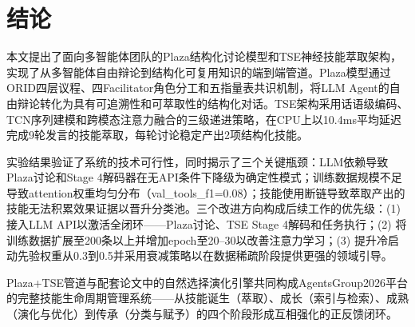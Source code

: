\documentclass[conference]{IEEEtran}
\begin{document}
\section{结论}

本文提出了面向多智能体团队的Plaza结构化讨论模型和TSE神经技能萃取架构，实现了从多智能体自由辩论到结构化可复用知识的端到端管道。Plaza模型通过ORID四层议程、四Facilitator角色分工和五指量表共识机制，将LLM Agent的自由辩论转化为具有可追溯性和可萃取性的结构化对话。TSE架构采用话语级编码、TCN序列建模和跨模态注意力融合的三级递进策略，在CPU上以10.4ms平均延迟完成9轮发言的技能萃取，每轮讨论稳定产出2项结构化技能。

实验结果验证了系统的技术可行性，同时揭示了三个关键瓶颈：LLM依赖导致Plaza讨论和Stage 4解码器在无API条件下降级为确定性模式；训练数据规模不足导致attention权重均匀分布（val\_tools\_f1=0.08）；技能使用断链导致萃取产出的技能无法积累效果证据以晋升分类池。三个改进方向构成后续工作的优先级：(1) 接入LLM API以激活全闭环——Plaza讨论、TSE Stage 4解码和任务执行；(2) 将训练数据扩展至200条以上并增加epoch至20--30以改善注意力学习；(3) 提升冷启动先验权重从0.3到0.5并采用衰减策略以在数据稀疏阶段提供更强的领域引导。

Plaza+TSE管道与配套论文中的自然选择演化引擎共同构成AgentsGroup2026平台的完整技能生命周期管理系统——从技能诞生（萃取）、成长（索引与检索）、成熟（演化与优化）到传承（分类与赋予）的四个阶段形成互相强化的正反馈闭环。



\end{document}
